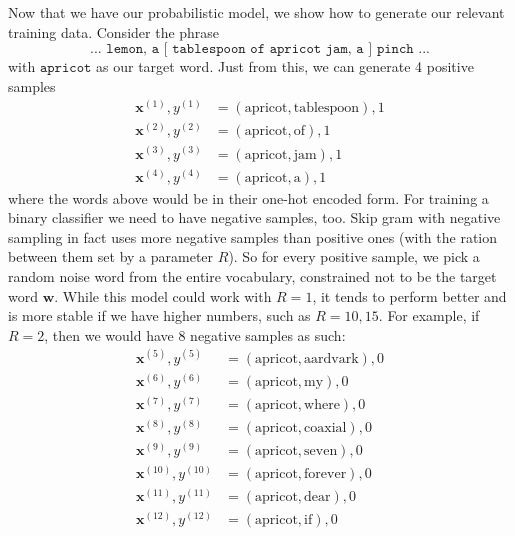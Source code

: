 \documentclass{article}
\begin{document}
      Now that we have our probabilistic model, we show how to generate our relevant training data. Consider the phrase 
      \begin{equation}
        \texttt{... lemon, a [ tablespoon of apricot jam, a ] pinch ...}
      \end{equation}
      with $\texttt{apricot}$ as our target word. Just from this, we can generate 4 positive samples 
      \begin{align*}
          \mathbf{x}^{(1)}, y^{(1)} & = (\text{apricot}, \text{tablespoon}), 1 \\
          \mathbf{x}^{(2)}, y^{(2)} & = (\text{apricot}, \text{of}), 1 \\
          \mathbf{x}^{(3)}, y^{(3)} & = (\text{apricot}, \text{jam}), 1 \\
          \mathbf{x}^{(4)}, y^{(4)} & = (\text{apricot}, \text{a}), 1 
      \end{align*}
      where the words above would be in their one-hot encoded form. For training a binary classifier we need to have negative samples, too. Skip gram with negative sampling in fact uses more negative samples than positive ones (with the ration between them set by a parameter $R$). So for every positive sample, we pick a random noise word from the entire vocabulary, constrained not to be the target word $\mathbf{w}$. While this model could work with $R = 1$, it tends to perform better and is more stable if we have higher numbers, such as $R = 10, 15$. For example, if $R = 2$, then we would have 8 negative samples as such: 
      \begin{align*}
          \mathbf{x}^{(5)}, y^{(5)} & = (\text{apricot}, \text{aardvark}), 0 \\
          \mathbf{x}^{(6)}, y^{(6)} & = (\text{apricot}, \text{my}), 0 \\
          \mathbf{x}^{(7)}, y^{(7)} & = (\text{apricot}, \text{where}), 0 \\
          \mathbf{x}^{(8)}, y^{(8)} & = (\text{apricot}, \text{coaxial}), 0 \\
          \mathbf{x}^{(9)}, y^{(9)} & = (\text{apricot}, \text{seven}), 0 \\
          \mathbf{x}^{(10)}, y^{(10)} & = (\text{apricot}, \text{forever}), 0 \\
          \mathbf{x}^{(11)}, y^{(11)} & = (\text{apricot}, \text{dear}), 0 \\
          \mathbf{x}^{(12)}, y^{(12)} & = (\text{apricot}, \text{if}), 0 
      \end{align*}
\end{document}
